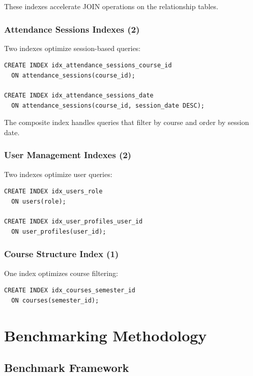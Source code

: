 \documentclass[conference]{IEEEtran}
\begin{document}
These indexes accelerate JOIN operations on the relationship tables.

\subsubsection{Attendance Sessions Indexes (2)}

Two indexes optimize session-based queries:

\begin{lstlisting}[caption=Attendance Sessions Indexes]
CREATE INDEX idx_attendance_sessions_course_id
  ON attendance_sessions(course_id);

CREATE INDEX idx_attendance_sessions_date
  ON attendance_sessions(course_id, session_date DESC);
\end{lstlisting}

The composite index handles queries that filter by course and order by session date.

\subsubsection{User Management Indexes (2)}

Two indexes optimize user queries:

\begin{lstlisting}[caption=User Management Indexes]
CREATE INDEX idx_users_role
  ON users(role);

CREATE INDEX idx_user_profiles_user_id
  ON user_profiles(user_id);
\end{lstlisting}

\subsubsection{Course Structure Index (1)}

One index optimizes course filtering:

\begin{lstlisting}[caption=Course Structure Index]
CREATE INDEX idx_courses_semester_id
  ON courses(semester_id);
\end{lstlisting}


\section{Benchmarking Methodology}

\subsection{Benchmark Framework}
\end{document}
